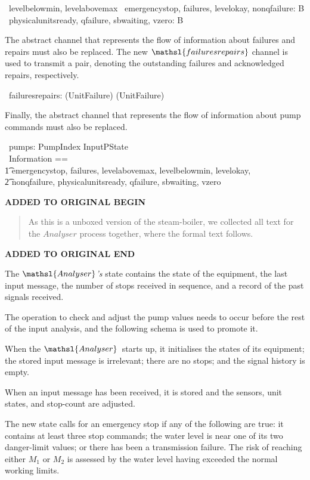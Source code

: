\documentclass{report}
\newcommand{\boolean}{{\mathbb B}}
\newenvironment{addedstuff}{\begin{flushleft}\textbf{ADDED TO ORIGINAL BEGIN}\begin{quote}\begin{minipage}{.8\textwidth}}{\end{minipage}\end{quote}\textbf{ADDED TO ORIGINAL END}\end{flushleft}}
\begin{document}
\begin{circus}
   \circchannel\ levelbelowmin, levelabovemax %
  \also %
  \circchannel\ emergencystop, failures, levelokay, nonqfailure: \boolean \\
  \circchannel\ physicalunitsready, qfailure, sbwaiting, vzero: \boolean
\end{circus}
The abstract channel that represents the flow of information about
failures and repairs must also be replaced.  The new \(
\mathsl{failuresrepairs} \)\/ channel is used to transmit a pair,
denoting the outstanding failures and acknowledged repairs,
respectively.
\begin{circus}
   \circchannel\ failuresrepairs: (\power UnitFailure) \cross (\power UnitFailure)
\end{circus}
Finally, the abstract channel that represents the flow of information
about pump commands must also be replaced.
\begin{circus}
  \circchannel\ pumps: PumpIndex \fun InputPState \\
  \circchannelset\ Information ==  \\ \t1
    \lchanset emergencystop, failures, levelabovemax, levelbelowmin, levelokay, \\ \t2
              nonqfailure, physicalunitsready, qfailure, sbwaiting, vzero \rchanset
\end{circus}

\begin{addedstuff}
   As this is a unboxed version of the steam-boiler, we collected all text for the
   $Analyser$ process together, where the formal text follows.
\end{addedstuff}

The \( \mathsl{Analyser} \)\textsl{'s}\/ state contains the state of
the equipment, the last input message, the number of stops received in
sequence, and a record of the past signals received.

The operation to check and adjust the pump values needs to occur
before the rest of the input analysis, and the following schema is
used to promote it.

When the \( \mathsl{Analyser} \, \)\/ starts up, it initialises the
states of its equipment; the stored input message is irrelevant; there
are no stops; and the signal history is empty.

When an input message has been received, it is stored and the sensors,
unit states, and stop-count are adjusted.

The new state calls for an emergency stop if any of the following are
true: it contains at least three stop commands; the water level is
near one of its two danger-limit values; or there has been a
transmission failure.  The risk of reaching either \( M_1 \)\/ or \(
M_2 \)\/ is assessed by the water level having exceeded the normal
working limits.
\end{document}
